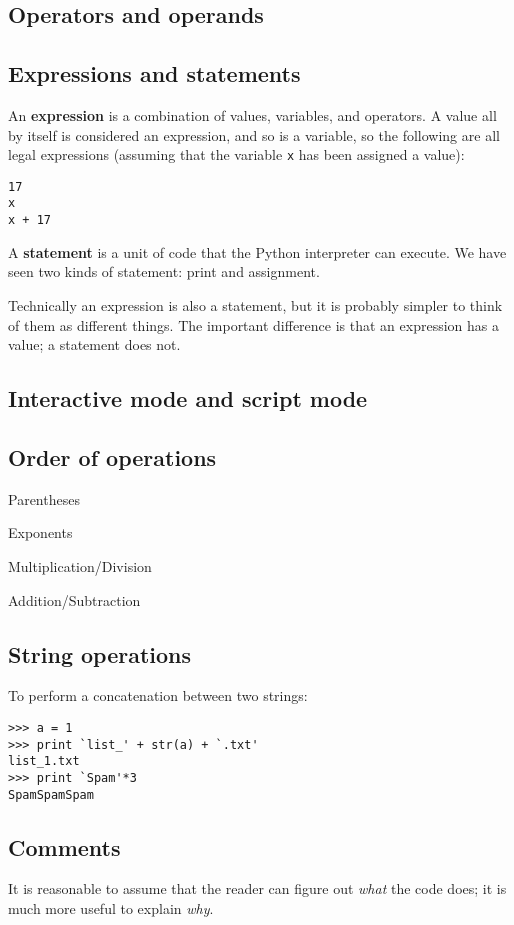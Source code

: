 \documentclass{article}
\begin{document}
\subsection{Operators and operands}
\subsection{Expressions and statements}
An \textbf{expression} is a combination of values, variables, and operators. A
value all by itself is considered an expression, and so is a variable,
so the following are all legal expressions (assuming that the variable
\verb|x| has been assigned a value):
\begin{verbatim}
17
x
x + 17
\end{verbatim}

A \textbf{statement} is a unit of code that the Python interpreter can execute.
We have seen two kinds of statement: print and assignment.

Technically an expression is also a statement, but it is probably
simpler to think of them as different things. The important difference
is that an expression has a value; a statement does not.
\subsection{Interactive mode and script mode}
\subsection{Order of operations}
\begin{itemize*}
    \item Parentheses
    \item Exponents
    \item Multiplication/Division
    \item Addition/Subtraction
\end{itemize*}
\subsection{String operations}
To perform a concatenation between two strings:
\begin{verbatim}
>>> a = 1
>>> print `list_' + str(a) + `.txt'
list_1.txt
>>> print `Spam'*3
SpamSpamSpam
\end{verbatim}
\subsection{Comments}
It is reasonable to assume that the reader can figure out
\emph{what} the code does; it is much more useful to explain
\emph{why}.
\end{document}
